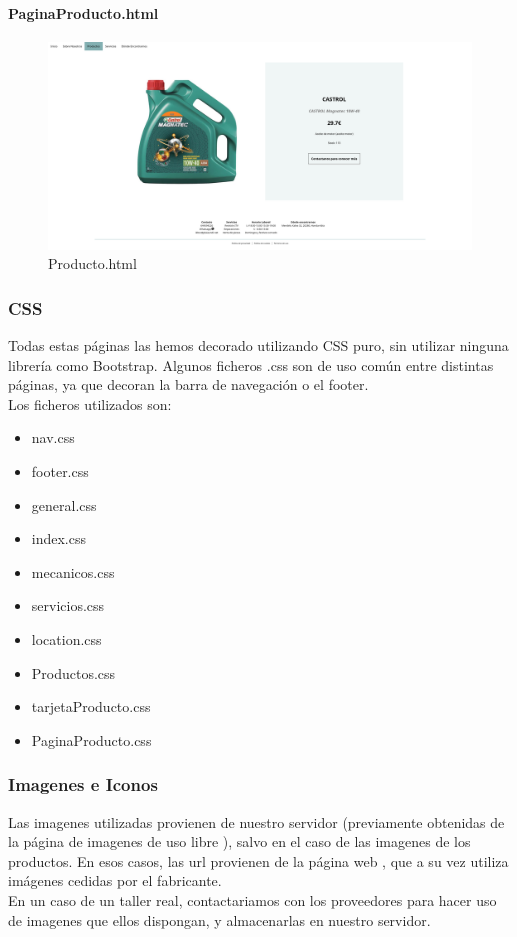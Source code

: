 \documentclass{article}
\begin{document}
\paragraph{PaginaProducto.html}
\begin{figure}[H]
  \centering
  \includegraphics[width=1.0\textwidth]{LMSI/CapturasWeb/Producto.png}
  \caption{Producto.html}
\end{figure}
\subsubsection{CSS}
Todas estas páginas las hemos decorado utilizando CSS puro, sin utilizar ninguna librería como Bootstrap. Algunos ficheros .css son de uso común entre distintas páginas, ya que decoran la barra de navegación o el footer. \\
Los ficheros utilizados son:\\
\begin{itemize}
  \item nav.css
  \item footer.css
  \item general.css
  \item index.css
  \item mecanicos.css
  \item servicios.css
  \item location.css
  \item Productos.css
  \item tarjetaProducto.css
  \item PaginaProducto.css
\end{itemize}
\subsubsection{Imagenes e Iconos}
Las imagenes utilizadas provienen de nuestro servidor (previamente obtenidas de la página de imagenes de uso libre \href{https://www.pexels.com/es-es/}{\color{red}{Pexels}}), salvo en el caso de las imagenes de los productos. En esos casos, las url provienen de la página web \href{https://www.oscaro.es/}{\color{red}{Oscaro}}, que a su vez utiliza imágenes cedidas por el fabricante.\\
En un caso de un taller real, contactariamos con los proveedores para hacer uso de imagenes que ellos dispongan, y almacenarlas en nuestro servidor.\\ 
\end{document}

